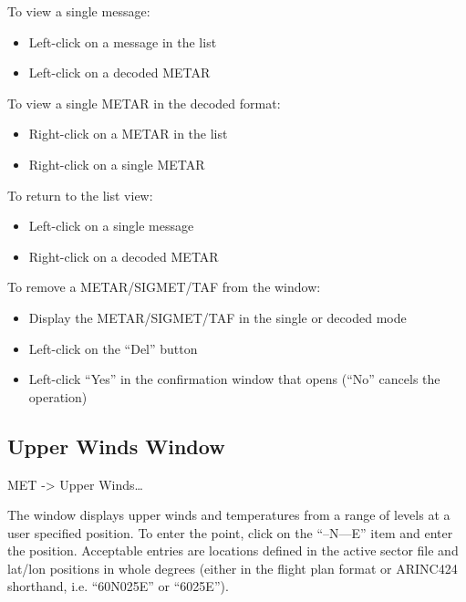 \documentclass[a4paper,oneside,11pt]{memoir}
\begin{document}
\bigskip

To view a single message:

\begin{itemize}
    \item Left-click on a message in the list
    \item Left-click on a decoded METAR
\end{itemize}

\bigskip

To view a single METAR in the decoded format:

\begin{itemize}
    \item Right-click on a METAR in the list
    \item Right-click on a single METAR
\end{itemize}

\bigskip

To return to the list view:

\begin{itemize}
    \item Left-click on a single message
    \item Right-click on a decoded METAR
\end{itemize}

\bigskip

To remove a METAR/SIGMET/TAF from the window:

\begin{itemize}
    \item Display the METAR/SIGMET/TAF in the single or decoded mode
    \item Left-click on the “Del” button
    \item Left-click “Yes” in the confirmation window that opens (“No” cancels the operation)
\end{itemize}

\subsection{Upper Winds Window}\label{win:uww}

 MET -> Upper Winds…


The window displays upper winds and temperatures from a range of levels at a user specified position. To enter the point, click on the “--N---E” item and enter the position. Acceptable entries are locations defined in the active sector file and lat/lon positions in whole degrees (either in the flight plan format or ARINC424 shorthand, i.e. “60N025E” or “6025E”).
\end{document}
